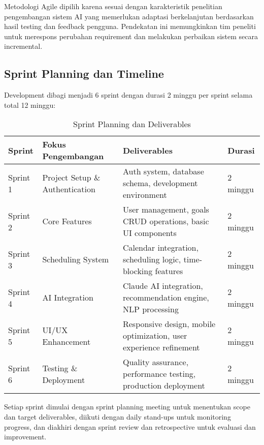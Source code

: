 Metodologi Agile dipilih karena sesuai dengan karakteristik penelitian pengembangan sistem AI yang memerlukan adaptasi berkelanjutan berdasarkan hasil testing dan feedback pengguna. Pendekatan ini memungkinkan tim peneliti untuk merespons perubahan requirement dan melakukan perbaikan sistem secara incremental.

\subsection{Sprint Planning dan Timeline}

Development dibagi menjadi 6 sprint dengan durasi 2 minggu per sprint selama total 12 minggu:

\begin{table}[ht]
\centering
\caption{Sprint Planning dan Deliverables}
\label{tab:sprint-planning}
\footnotesize
\begin{adjustbox}{width=\textwidth,center}
\begin{tabular}{@{}p{1.5cm}p{4cm}p{6cm}p{2cm}@{}}
\toprule
\textbf{Sprint} & \textbf{Fokus Pengembangan} & \textbf{Deliverables} & \textbf{Durasi} \\
\midrule
Sprint 1 & Project Setup \& Authentication & Auth system, database schema, development environment & 2 minggu \\
\hline
Sprint 2 & Core Features & User management, goals CRUD operations, basic UI components & 2 minggu \\
\hline
Sprint 3 & Scheduling System & Calendar integration, scheduling logic, time-blocking features & 2 minggu \\
\hline
Sprint 4 & AI Integration & Claude AI integration, recommendation engine, NLP processing & 2 minggu \\
\hline
Sprint 5 & UI/UX Enhancement & Responsive design, mobile optimization, user experience refinement & 2 minggu \\
\hline
Sprint 6 & Testing \& Deployment & Quality assurance, performance testing, production deployment & 2 minggu \\
\bottomrule
\end{tabular}
\end{adjustbox}
\end{table}

Setiap sprint dimulai dengan sprint planning meeting untuk menentukan scope dan target deliverables, diikuti dengan daily stand-ups untuk monitoring progress, dan diakhiri dengan sprint review dan retrospective untuk evaluasi dan improvement.

